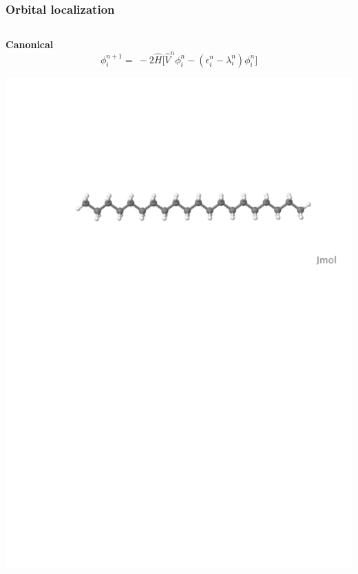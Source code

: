 \begin{frame}
    \frametitle{Orbital localization}
    \begin{columns}
    \begin{column}[b]{0.48\linewidth}
    \begin{center}
    \textbf{Canonical}
    \begin{equation}
        \nonumber
        \phi_i^{n+1} =\ -2\hat{H}\Bigg[\hat{V}^n\phi_i^n
        - (\epsilon^n_i - \lambda^n_i)\phi_i^n\Bigg]
    \end{equation}

    \vspace{8mm}

    \includegraphics[scale=0.3, clip, viewport = 80 560 600 700]
        {figures/alkane.pdf}\\

\end{center}
\end{column}
\end{columns}
\end{frame}
